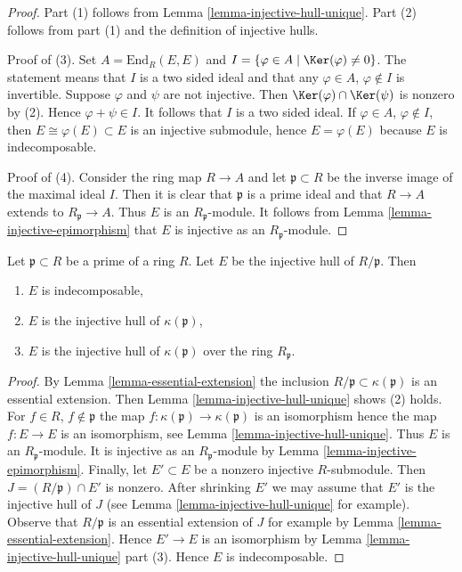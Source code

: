 \begin{proof}
Part (1) follows from Lemma \ref{lemma-injective-hull-unique}.
Part (2) follows from part (1) and the definition of injective hulls.

\medskip\noindent
Proof of (3). Set $A = \text{End}_R(E, E)$ and
$I = \{\varphi \in A \mid \Ker(\varphi) \not = 0\}$.
The statement means that $I$ is a two sided ideal and
that any $\varphi \in A$, $\varphi \not \in I$ is invertible.
Suppose $\varphi$ and $\psi$ are not injective.
Then $\Ker(\varphi) \cap \Ker(\psi)$ is nonzero
by (2). Hence $\varphi + \psi \in I$. It follows that $I$
is a two sided ideal. If $\varphi \in A$, $\varphi \not \in I$,
then $E \cong \varphi(E) \subset E$ is an injective submodule,
hence $E = \varphi(E)$ because $E$ is indecomposable.

\medskip\noindent
Proof of (4). Consider the ring map $R \to A$ and let $\mathfrak p \subset R$
be the inverse image of the maximal ideal $I$. Then it is clear
that $\mathfrak p$ is a prime ideal and that $R \to A$ extends to
$R_\mathfrak p \to A$. Thus $E$ is an $R_\mathfrak p$-module.
It follows from Lemma \ref{lemma-injective-epimorphism} that $E$ is injective
as an $R_\mathfrak p$-module.
\end{proof}

\begin{lemma}
\label{lemma-injective-hull-indecomposable}
Let $\mathfrak p \subset R$ be a prime of a ring $R$.
Let $E$ be the injective hull of $R/\mathfrak p$. Then
\begin{enumerate}
\item $E$ is indecomposable,
\item $E$ is the injective hull of $\kappa(\mathfrak p)$,
\item $E$ is the injective hull of $\kappa(\mathfrak p)$
over the ring $R_\mathfrak p$.
\end{enumerate}
\end{lemma}

\begin{proof}
By Lemma \ref{lemma-essential-extension} the inclusion
$R/\mathfrak p \subset \kappa(\mathfrak p)$ is an essential
extension. Then Lemma \ref{lemma-injective-hull-unique}
shows (2) holds. For $f \in R$, $f \not \in \mathfrak p$
the map $f : \kappa(\mathfrak p) \to \kappa(\mathfrak p)$ is an isomorphism
hence the map $f : E \to E$ is an isomorphism,
see Lemma \ref{lemma-injective-hull-unique}.
Thus $E$ is an $R_\mathfrak p$-module. It is injective
as an $R_\mathfrak p$-module by Lemma \ref{lemma-injective-epimorphism}.
Finally, let $E' \subset E$ be a nonzero injective $R$-submodule.
Then $J = (R/\mathfrak p) \cap E'$ is nonzero. After shrinking $E'$
we may assume that $E'$ is the injective hull of $J$ (see
Lemma \ref{lemma-injective-hull-unique} for example).
Observe that $R/\mathfrak p$ is an essential extension of $J$ for example by
Lemma \ref{lemma-essential-extension}. Hence $E' \to E$
is an isomorphism by Lemma \ref{lemma-injective-hull-unique} part (3).
Hence $E$ is indecomposable.
\end{proof}

